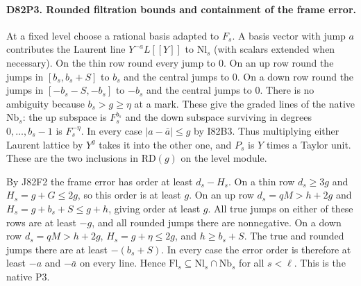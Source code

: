 \paragraph{D82P3. Rounded filtration bounds and containment of the frame error.}
At a fixed level choose a rational basis adapted to $F_s$.
A basis vector with jump $a$ contributes the Laurent line
$Y^{-a}L[[Y]]$ to $\mathrm{Nl}_s$ (with scalars extended
when necessary). On the thin row round every jump to $0$.
On an up row round the jumps in $[b_s,b_s+S]$ to $b_s$ and
the central jumps to $0$. On a down row round the jumps in
$[-b_s-S,-b_s]$ to $-b_s$ and the central jumps to $0$.
There is no ambiguity because $b_s>g\ge\eta$ at a mark.
These give the graded lines of the native $\mathrm{Nb}_s$:
the up subspace is $F_s^{b_s}$ and the down subspace surviving
in degrees $0,\ldots,b_s-1$ is $F_s^{-\eta}$. In every
case $|a-\bar a|\le g$ by I82B3. Thus multiplying either
Laurent lattice by $Y^g$ takes it into the other one, and $P_s$
is $Y$ times a Taylor unit. These are the two inclusions in
$\mathrm{RD}(g)$ on the level module.

By J82F2 the frame error has order at least $d_s-H_s$.
On a thin row $d_s\ge3g$ and $H_s=g+G\le2g$, so this order
is at least $g$. On an up row $d_s=qM>h+2g$ and
$H_s=g+b_s+S\le g+h$, giving order at least $g$.
All true jumps on either of these rows are at least $-g$,
and all rounded jumps there are nonnegative. On a down row
$d_s=qM>h+2g$, $H_s=g+\eta\le2g$, and $h\ge b_s+S$.
The true and rounded jumps there are at least $-(b_s+S)$.
In every case the error order is therefore at least $-a$ and
$-\bar a$ on every line. Hence
$\mathrm{Fl}_s\subseteq\mathrm{Nl}_s\cap\mathrm{Nb}_s$ for
all $s<\ell$. This is the native $\mathrm{P3}$.
